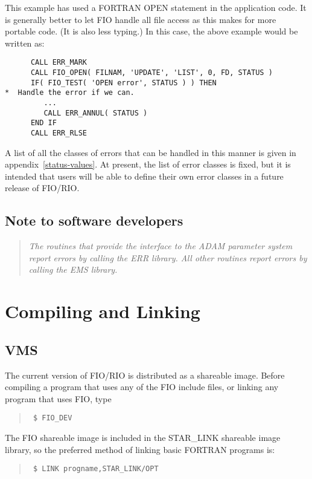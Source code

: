 This example has used a FORTRAN OPEN statement in the application code. It is
generally better to let FIO handle all file access as this makes for more
portable code. (It is also less typing.) In this case, the above example would
be written as:

\begin{verbatim}
      CALL ERR_MARK
      CALL FIO_OPEN( FILNAM, 'UPDATE', 'LIST', 0, FD, STATUS )
      IF( FIO_TEST( 'OPEN error', STATUS ) ) THEN
*  Handle the error if we can.
         ...
         CALL ERR_ANNUL( STATUS )
      END IF
      CALL ERR_RLSE
\end{verbatim}

A list of all the classes of errors that can be handled in this manner is given
in appendix~\ref{status-values}. At present, the list of error classes is
fixed, but it is intended that users will be able to define their own error
classes in a future release of FIO/RIO.

\subsection{Note to software developers}
\begin{quote}
{\it 
The routines that provide the interface to the ADAM parameter system report
errors by calling the ERR library. All other routines report errors by calling
the EMS library.}
\end{quote}

\section{Compiling and Linking}

\subsection{VMS}

The current version of FIO/RIO is distributed as a shareable image. Before
compiling a program that uses any of the FIO include files, or linking any
program that uses FIO, type 

\begin{quote}{\tt
\$ FIO\_DEV
}
\end{quote}

The FIO shareable image is included in the STAR\_LINK shareable image library,
so the preferred method of linking basic FORTRAN programs is:

\begin{quote}{\tt
\$ LINK progname,STAR\_LINK/OPT
}
\end{quote}

